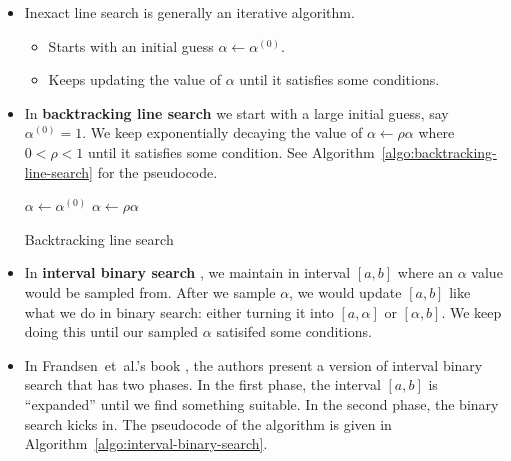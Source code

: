 \documentclass[10pt]{article}
\newcommand{\etal}{{et~al.}}
\begin{document}
\begin{itemize}
    \item Inexact line search is generally an iterative algorithm.
    \begin{itemize}
        \item Starts with an initial guess $\alpha \gets \alpha^{(0)}$.
        \item Keeps updating the value of $\alpha$ until it satisfies some conditions.
    \end{itemize}

    \item In {\bf backtracking line search} \cite{Norcedal:2006} we start with a large initial guess, say $\alpha^{(0)} = 1$. We keep exponentially decaying the value of $\alpha \gets \rho \alpha$  where $0 < \rho < 1$ until it satisfies some condition. See Algorithm~\ref{algo:backtracking-line-search} for the pseudocode.
    
    \begin{algorithm}[t]
    \begin{algorithmic}
        \State $\alpha \gets \alpha^{(0)}$
            \State $\alpha \gets \rho \alpha$
        \EndWhile        
    \end{algorithmic}    
    \caption{Backtracking line search}
    \label{algo:backtracking-line-search}
    \end{algorithm}

    \item In {\bf interval binary search} \cite{Frandsen:2004}, we maintain in interval $[a,b]$ where an $\alpha$ value would be sampled from. After we sample $\alpha$, we would update $[a,b]$ like what we do in binary search: either turning it into $[a,\alpha]$ or $[\alpha,b]$. We keep doing this until our sampled $\alpha$ satisifed some conditions.

    \item In Frandsen~\etal's book \cite{Frandsen:2004}, the authors present a version of interval binary search that has two phases. In the first phase, the interval $[a,b]$ is ``expanded'' until we find something suitable. In the second phase, the binary search kicks in. The pseudocode of the algorithm is given in Algorithm~\ref{algo:interval-binary-search}.
        

\end{itemize}
\end{document}

